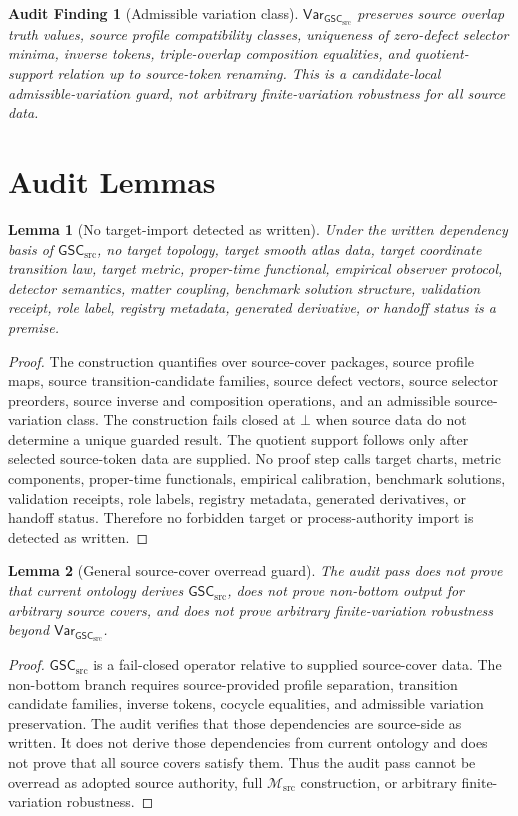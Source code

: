 \documentclass[11pt]{article}
\newcommand{\Msrc}{\mathcal{M}_{\mathrm{src}}}
\newcommand{\GSC}{\mathsf{GSC}_{\mathrm{src}}}
\newcommand{\Vargsc}{\mathsf{Var}_{\GSC}}
\newcommand{\Bot}{\bot}
\newtheorem{audit}{Audit Finding}
\newtheorem{lemma}{Lemma}
\begin{document}
\begin{audit}[Admissible variation class]
\(\Vargsc\) preserves source overlap truth values, source profile
compatibility classes, uniqueness of zero-defect selector minima, inverse
tokens, triple-overlap composition equalities, and quotient-support relation
up to source-token renaming. This is a candidate-local admissible-variation
guard, not arbitrary finite-variation robustness for all source data.
\end{audit}

\section{Audit Lemmas}

\begin{lemma}[No target-import detected as written]
Under the written dependency basis of \(\GSC\), no target topology, target
smooth atlas data, target coordinate transition law, target metric,
proper-time functional, empirical observer protocol, detector semantics,
matter coupling, benchmark solution structure, validation receipt, role
label, registry metadata, generated derivative, or handoff status is a
premise.
\end{lemma}

\begin{proof}
The construction quantifies over source-cover packages, source profile maps,
source transition-candidate families, source defect vectors, source selector
preorders, source inverse and composition operations, and an admissible
source-variation class. The construction fails closed at \(\Bot\) when source
data do not determine a unique guarded result. The quotient support follows
only after selected source-token data are supplied. No proof step calls target
charts, metric components, proper-time functionals, empirical calibration,
benchmark solutions, validation receipts, role labels, registry metadata,
generated derivatives, or handoff status. Therefore no forbidden target or
process-authority import is detected as written.
\end{proof}

\begin{lemma}[General source-cover overread guard]
The audit pass does not prove that current ontology derives \(\GSC\), does
not prove non-bottom output for arbitrary source covers, and does not prove
arbitrary finite-variation robustness beyond \(\Vargsc\).
\end{lemma}

\begin{proof}
\(\GSC\) is a fail-closed operator relative to supplied source-cover data. The
non-bottom branch requires source-provided profile separation, transition
candidate families, inverse tokens, cocycle equalities, and admissible
variation preservation. The audit verifies that those dependencies are
source-side as written. It does not derive those dependencies from current
ontology and does not prove that all source covers satisfy them. Thus the
audit pass cannot be overread as adopted source authority, full \(\Msrc\)
construction, or arbitrary finite-variation robustness.
\end{proof}
\end{document}
